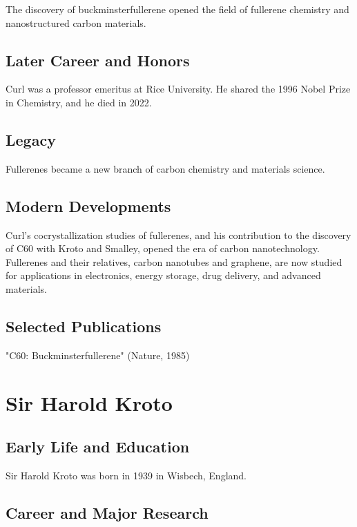 The discovery of buckminsterfullerene opened the field of fullerene chemistry and nanostructured carbon materials.

\subsection*{Later Career and Honors}

Curl was a professor emeritus at Rice University. He shared the 1996 Nobel Prize in Chemistry, and he died in 2022.

\subsection*{Legacy}

Fullerenes became a new branch of carbon chemistry and materials science.

\subsection*{Modern Developments}

Curl's cocrystallization studies of fullerenes, and his contribution to the discovery of C60 with Kroto and Smalley, opened the era of carbon nanotechnology. Fullerenes and their relatives, carbon nanotubes and graphene, are now studied for applications in electronics, energy storage, drug delivery, and advanced materials.

\subsection*{Selected Publications}

"C60: Buckminsterfullerene" (Nature, 1985)

\clearpage

\section{Sir Harold Kroto}

\subsection*{Early Life and Education}

Sir Harold Kroto was born in 1939 in Wisbech, England.

\subsection*{Career and Major Research}

